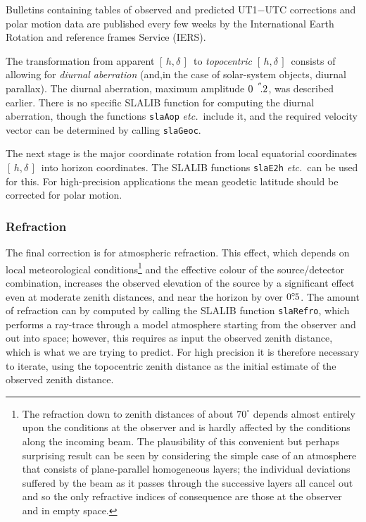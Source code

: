 \documentclass[11pt,fleqn,twoside]{article}
\renewcommand{\_}{{\tt\char'137}}     %
\newcommand{\hadec}     {$[\,h,\delta\,]$}
\newcommand{\degree}[2] {$#1^{\circ}
                        \hspace{-0.37em}.\hspace{0.02em}#2$}
\newcommand{\arcseci}[1] {$#1\hspace{0.05em}$\raisebox{-0.5ex}
                         {$^{'\hspace{-0.1em}'\hspace{0.0em}}$}}
\newcommand{\arcsec}[2] {\arcseci{#1}$\hspace{-0.35em}.#2$}
\begin{document}
Bulletins containing tables of observed and
predicted UT1$-$UTC corrections and polar motion data
are published every few weeks by the International Earth Rotation and
reference frames Service (IERS).
 
The transformation from apparent \hadec\ to {\it topocentric}\/
\hadec\ consists of allowing for
{\it diurnal aberration} (and,in the case of
solar-system objects, diurnal parallax).
The diurnal aberration, maximum amplitude \arcsec{0}{2},
was described earlier.  There is no specific SLALIB function
for computing the diurnal aberration,
though the functions
{\tt slaAop} {\it etc.}\
include it, and the required velocity vector can be
determined by calling
{\tt slaGeoc}.
 
The next stage is the major coordinate rotation from local equatorial
coordinates \hadec\ into horizon coordinates.  The SLALIB functions
{\tt slaE2h}
{\it etc.}\ can be used for this.  For high-precision
applications the mean geodetic latitude should be corrected for polar
motion.

\subsubsection{Refraction}
The final correction is for atmospheric refraction.
This effect, which depends on local meteorological
conditions\footnote{The refraction down to zenith distances of about
$70^\circ$ depends almost entirely upon the
conditions at the observer and is hardly affected by the
conditions along the incoming beam.  The plausibility of this
convenient but perhaps surprising result can be seen by considering
the simple case of an atmosphere that consists
of plane-parallel homogeneous layers;  the individual
deviations suffered by the beam as it passes through the
successive layers all cancel out and so the only refractive
indices of consequence are those at the observer and in empty space.}
and the effective colour of the source/detector combination,
increases the observed elevation of the source by a
significant effect even at moderate zenith distances, and near the
horizon by over \degree{0}{5}.  The amount of refraction can by
computed by calling the SLALIB function
{\tt slaRefro}, which performs a ray-trace through
a model atmosphere starting from the observer and out into space;
however,
this requires as input the observed zenith distance, which is what
we are trying to predict.  For high precision it is
therefore necessary to iterate, using the topocentric
zenith distance as the initial estimate of the
observed zenith distance.
 
\end{document}
